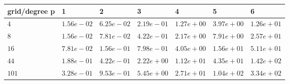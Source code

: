 \begin{tabular}{lllllll}
\hline
 grid/degree p   & 1          & 2          & 3          & 4          & 5          & 6          \\
\hline
 $4$             & $1.56e-02$ & $6.25e-02$ & $2.19e-01$ & $1.27e+00$ & $3.97e+00$ & $1.26e+01$ \\
 $8$             & $1.56e-02$ & $7.81e-02$ & $4.22e-01$ & $2.17e+00$ & $7.91e+00$ & $2.57e+01$ \\
 $16$            & $7.81e-02$ & $1.56e-01$ & $7.98e-01$ & $4.05e+00$ & $1.56e+01$ & $5.11e+01$ \\
 $44$            & $1.88e-01$ & $4.22e-01$ & $2.22e+00$ & $1.12e+01$ & $4.35e+01$ & $1.42e+02$ \\
 $101$           & $3.28e-01$ & $9.53e-01$ & $5.45e+00$ & $2.71e+01$ & $1.04e+02$ & $3.34e+02$ \\
\hline
\end{tabular}
